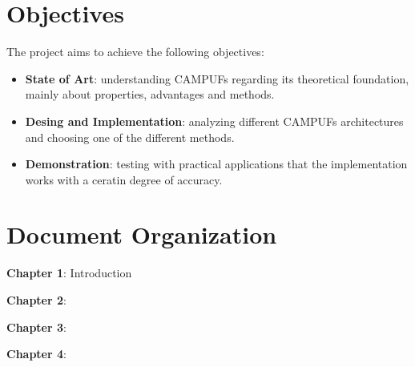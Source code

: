 \section {Objectives}
The project aims to achieve the following objectives:
\begin{itemize}
    \item \textbf{State of Art}: understanding CAMPUFs regarding its theoretical foundation, mainly about properties, advantages and methods.
    

    \item \textbf{Desing and Implementation}: analyzing different CAMPUFs architectures and choosing one of the different methods.
    
    
    \item \textbf{Demonstration}: testing with practical applications that the implementation works with a ceratin degree of accuracy.

\end{itemize}

\section {Document Organization}
\textbf{Chapter 1}: Introduction


\textbf{Chapter 2}:


\textbf{Chapter 3}:


\textbf{Chapter 4}: